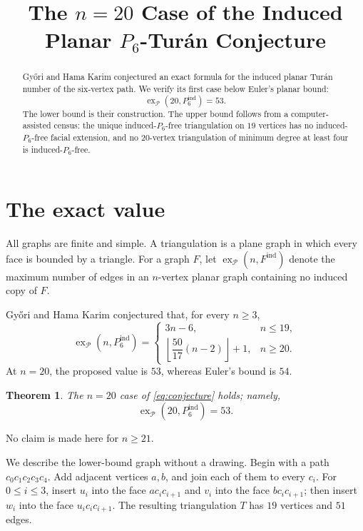 \documentclass[11pt]{amsart}
\title[The induced planar $P_6$-Tur\'an conjecture at $n=20$]
{The $n=20$ Case of the Induced Planar $P_6$-Tur\'an Conjecture}
\date{}
\newtheorem{theorem}{Theorem}
\newcommand{\cP}{\mathcal P}
\newcommand{\exP}{\operatorname{ex}_{\cP}}
\newcommand{\ind}{\mathrm{ind}}
\begin{document}
\begin{abstract}
Gy\H{o}ri and Hama Karim conjectured an exact formula for the induced planar
Tur\'an number of the six-vertex path. We verify its first case below
Euler's planar bound:
\[
  \exP(20,P_6^{\ind})=53.
\]
The lower bound is their construction. The upper bound follows from a
computer-assisted census: the unique induced-$P_6$-free triangulation on
$19$ vertices has no induced-$P_6$-free facial extension, and no
$20$-vertex triangulation of minimum degree at least four is
induced-$P_6$-free.
\end{abstract}

\maketitle

\section{The exact value}

All graphs are finite and simple. A triangulation is a plane graph in which
every face is bounded by a triangle. For a graph $F$, let
$\exP(n,F^{\ind})$ denote the maximum number of edges in an $n$-vertex
planar graph containing no induced copy of $F$.

Gy\H{o}ri and Hama Karim \cite[Conjecture~5.1]{GyoriKarim} conjectured
that, for every $n\geq 3$,
\begin{equation}\label{eq:conjecture}
\exP(n,P_6^{\ind})=
\begin{cases}
3n-6, & n\leq 19,\\[1mm]
\left\lfloor \dfrac{50}{17}(n-2)\right\rfloor+1, & n\geq 20.
\end{cases}
\end{equation}
At $n=20$, the proposed value is $53$, whereas Euler's bound is $54$.

\begin{theorem}\label{thm:main}
The $n=20$ case of \eqref{eq:conjecture} holds; namely,
\[
  \exP(20,P_6^{\ind})=53.
\]
\end{theorem}

No claim is made here for $n\geq 21$.

We describe the lower-bound graph without a drawing. Begin with a path
$c_0c_1c_2c_3c_4$. Add adjacent vertices $a,b$, and join each of them to
every $c_i$. For $0\leq i\leq 3$, insert $u_i$ into the face
$ac_ic_{i+1}$ and $v_i$ into the face $bc_ic_{i+1}$; then insert $w_i$
into the face $u_ic_ic_{i+1}$. The resulting triangulation $T$ has
$19$ vertices and $51$ edges.
\end{document}
